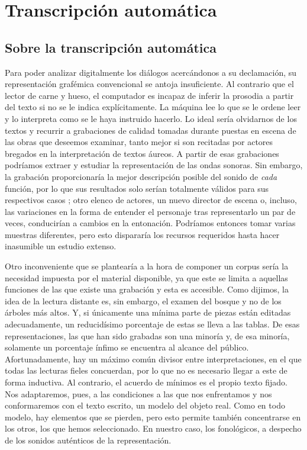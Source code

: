 \chapter{Transcripción automática}
\section{Sobre la transcripción automática}
\setcounter{exx}{0}
Para poder analizar digitalmente los diálogos acercándonos a su declamación, su representación grafémica convencional se antoja insuficiente. Al contrario que el lector de carne y hueso, el computador es incapaz de inferir la prosodia a partir del texto si no se le indica explícitamente. La máquina lee lo que se le ordene leer y lo interpreta como se le haya instruido hacerlo. Lo ideal sería olvidarnos de los textos y recurrir a grabaciones de calidad tomadas durante puestas en escena de las obras que deseemos examinar, tanto mejor si son recitadas por actores bregados en la interpretación de textos áureos. A partir de esas grabaciones podríamos extraer y estudiar la representación de las ondas sonoras. Sin embargo, la grabación proporcionaría la mejor descripción posible del sonido de \textit{cada} función, por lo que sus resultados solo serían totalmente válidos para sus respectivos casos \parencite[12]{sanchez2017}; otro elenco de actores, un nuevo director de escena o, incluso, las variaciones en la forma de entender el personaje tras representarlo un par de veces, conducirían a cambios en la entonación. Podríamos entonces tomar varias muestras diferentes, pero esto dispararía los recursos requeridos hasta hacer inasumible un estudio extenso.

Otro inconveniente que se plantearía a la hora de componer un corpus sería la necesidad impuesta por el material disponible, ya que este se limita a aquellas funciones de las que existe una grabación y esta es accesible. Como dijimos, la idea de la lectura distante es, sin embargo, el examen del bosque y no de los árboles más altos. Y, si únicamente una mínima parte de piezas están editadas adecuadamente, un reducidísimo porcentaje de estas se lleva a las tablas. De esas representaciones, las que han sido grabadas son una minoría y, de esa minoría, solamente un porcentaje ínfimo se encuentra al alcance del público. Afortunadamente, hay un máximo común divisor entre interpretaciones, en el que todas las lecturas fieles concuerdan, por lo que no es necesario llegar a este de forma inductiva. Al contrario, el acuerdo de mínimos es el propio texto fijado. Nos adaptaremos, pues, a las condiciones a las que nos enfrentamos y nos conformaremos con el texto escrito, un modelo del objeto real. Como en todo modelo, hay elementos que se pierden, pero esto permite también concentrarse en los otros, los que hemos seleccionado. En nuestro caso, los fonológicos, a despecho de los sonidos auténticos de la representación.

